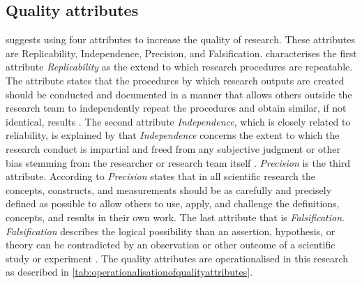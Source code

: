 \subsection{Quality attributes}
\label{sub:qualityattributes}
\textcite[p. 15-17]{Recker2013} suggests using four attributes to increase the quality of research. These attributes are Replicability, Independence, Precision, and Falsification. \textcite[p.~15]{Recker2013} characterises the first attribute \textit{Replicability} as the extend to which research procedures are repeatable. The attribute states that the procedures by which research outputs are created should be conducted and documented in a manner that allows others outside the research team to independently repeat the procedures and obtain similar, if not identical, results \parencite[p.~15]{Recker2013}. The second attribute \textit{Independence}, which is closely related to reliability, is explained by \textcite[p.~16]{Recker2013} that \textit{Independence} concerns the extent to which the research conduct is impartial and freed from any subjective judgment or other bias stemming from the researcher or research team itself \parencite[p.~16]{Recker2013}. \textit{Precision} is the third attribute. According to \textcite[p.~16]{Recker2013} \textit{Precision} states that in all scientific research the concepts, constructs, and measurements should be as carefully and precisely defined as possible to allow others to use, apply, and challenge the definitions, concepts, and results in their own work. The last attribute that is \textit{Falsification}. \textit{Falsification} describes the logical possibility than an assertion, hypothesis, or theory can be contradicted by an observation or other outcome of a scientific study or experiment \parencite[p.~16]{Recker2013}. The quality attributes are operationalised in this research as described in \cref{tab:operationalisationofqualityattributes}.
